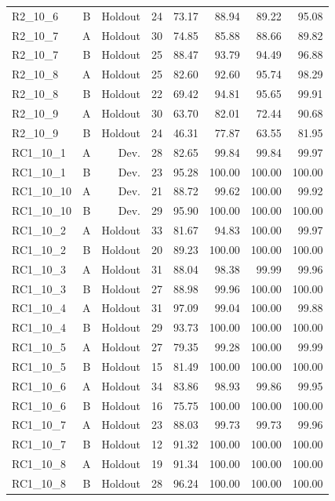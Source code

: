 \begin{longtable}{@{}lrrrrrrr@{}}
R2\_10\_6 & B & Holdout & 24 & 73.17 & 88.94 & 89.22 & 95.08 \\
R2\_10\_7 & A & Holdout & 30 & 74.85 & 85.88 & 88.66 & 89.82 \\
R2\_10\_7 & B & Holdout & 25 & 88.47 & 93.79 & 94.49 & 96.88 \\
R2\_10\_8 & A & Holdout & 25 & 82.60 & 92.60 & 95.74 & 98.29 \\
R2\_10\_8 & B & Holdout & 22 & 69.42 & 94.81 & 95.65 & 99.91 \\
R2\_10\_9 & A & Holdout & 30 & 63.70 & 82.01 & 72.44 & 90.68 \\
R2\_10\_9 & B & Holdout & 24 & 46.31 & 77.87 & 63.55 & 81.95 \\
RC1\_10\_1 & A & Dev. & 28 & 82.65 & 99.84 & 99.84 & 99.97 \\
RC1\_10\_1 & B & Dev. & 23 & 95.28 & 100.00 & 100.00 & 100.00 \\
RC1\_10\_10 & A & Dev. & 21 & 88.72 & 99.62 & 100.00 & 99.92 \\
RC1\_10\_10 & B & Dev. & 29 & 95.90 & 100.00 & 100.00 & 100.00 \\
RC1\_10\_2 & A & Holdout & 33 & 81.67 & 94.83 & 100.00 & 99.97 \\
RC1\_10\_2 & B & Holdout & 20 & 89.23 & 100.00 & 100.00 & 100.00 \\
RC1\_10\_3 & A & Holdout & 31 & 88.04 & 98.38 & 99.99 & 99.96 \\
RC1\_10\_3 & B & Holdout & 27 & 88.98 & 99.96 & 100.00 & 100.00 \\
RC1\_10\_4 & A & Holdout & 31 & 97.09 & 99.04 & 100.00 & 99.88 \\
RC1\_10\_4 & B & Holdout & 29 & 93.73 & 100.00 & 100.00 & 100.00 \\
RC1\_10\_5 & A & Holdout & 27 & 79.35 & 99.28 & 100.00 & 99.99 \\
RC1\_10\_5 & B & Holdout & 15 & 81.49 & 100.00 & 100.00 & 100.00 \\
RC1\_10\_6 & A & Holdout & 34 & 83.86 & 98.93 & 99.86 & 99.95 \\
RC1\_10\_6 & B & Holdout & 16 & 75.75 & 100.00 & 100.00 & 100.00 \\
RC1\_10\_7 & A & Holdout & 23 & 88.03 & 99.73 & 99.73 & 99.96 \\
RC1\_10\_7 & B & Holdout & 12 & 91.32 & 100.00 & 100.00 & 100.00 \\
RC1\_10\_8 & A & Holdout & 19 & 91.34 & 100.00 & 100.00 & 100.00 \\
RC1\_10\_8 & B & Holdout & 28 & 96.24 & 100.00 & 100.00 & 100.00 \\

\end{longtable}
